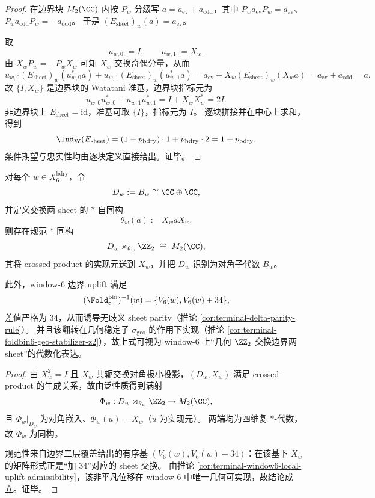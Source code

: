 \begin{proof}
在边界块 \(M_2(\CC)\) 内按 \(P_w\)-分级写
\(
a=a_{\mathrm{ev}}+a_{\mathrm{odd}}
\)，其中
\(
P_wa_{\mathrm{ev}}P_w=a_{\mathrm{ev}}
\)、\(
P_wa_{\mathrm{odd}}P_w=-a_{\mathrm{odd}}
\)。
于是 \((E_{\mathrm{sheet}})_w(a)=a_{\mathrm{ev}}\)。

取
\[
u_{w,0}:=I,\qquad u_{w,1}:=X_w.
\]
由 \(X_wP_w=-P_wX_w\) 可知 \(X_w\) 交换奇偶分量，从而
\[
u_{w,0}(E_{\mathrm{sheet}})_w(u_{w,0}^\ast a)+u_{w,1}(E_{\mathrm{sheet}})_w(u_{w,1}^\ast a)
=a_{\mathrm{ev}}+X_w(E_{\mathrm{sheet}})_w(X_wa)
=a_{\mathrm{ev}}+a_{\mathrm{odd}}
=a.
\]
故 \(\{I,X_w\}\) 是边界块的 Watatani 准基，边界块指标元为
\[
u_{w,0}u_{w,0}^\ast+u_{w,1}u_{w,1}^\ast=I+X_wX_w^\ast=2I.
\]
非边界块上 \(E_{\mathrm{sheet}}=\mathrm{id}\)，准基可取 \(\{I\}\)，指标元为 \(I\)。
逐块拼接并在中心上求和，得到
\[
\Ind_{\mathrm W}(E_{\mathrm{sheet}})
=(1-p_{\mathrm{bdry}})\cdot 1+p_{\mathrm{bdry}}\cdot 2
=1+p_{\mathrm{bdry}}.
\]
条件期望与忠实性均由逐块定义直接给出。证毕。
\end{proof}

\begin{theorem}[边界块的 crossed product 刻画与 \texorpdfstring{\(\delta=34\)}{delta=34} 的几何实现]\label{thm:conclusion-window6-boundary-crossed-product-delta34}
对每个 \(w\in X_6^{\mathrm{bdry}}\)，令
\[
D_w:=B_w\cong \CC\oplus\CC,
\]
并定义交换两 sheet 的 \(\ast\)-自同构
\[
\theta_w(a):=X_waX_w.
\]
则存在规范 \(\ast\)-同构
\[
D_w\rtimes_{\theta_w}\ZZ_2\ \cong\ M_2(\CC),
\]
其将 crossed-product 的实现元送到 \(X_w\)，并把 \(D_w\) 识别为对角子代数 \(B_w\)。

此外，window-\(6\) 边界 uplift 满足
\[
(\Fold^{\mathrm{bin}}_6)^{-1}(w)=\{V_6(w),V_6(w)+34\},
\]
差值严格为 \(34\)，从而诱导无歧义 sheet parity（推论 \ref{cor:terminal-delta-parity-rule}）。
并且该翻转在几何稳定子 \(\sigma_{\mathrm{geo}}\) 的作用下实现（推论 \ref{cor:terminal-foldbin6-geo-stabilizer-z2}），故上式可视为 window-\(6\) 上“几何 \(\ZZ_2\) 交换边界两 sheet”的代数化表达。
\end{theorem}
\begin{proof}
由 \(X_w^2=I\) 且 \(X_w\) 共轭交换对角极小投影，\((D_w,X_w)\) 满足 crossed-product 的生成关系，故由泛性质得到满射
\[
\Phi_w:D_w\rtimes_{\theta_w}\ZZ_2\to M_2(\CC),
\]
且 \(\Phi_w|_{D_w}\) 为对角嵌入、\(\Phi_w(u)=X_w\)（\(u\) 为实现元）。
两端均为四维复 \(\ast\)-代数，故 \(\Phi_w\) 为同构。

规范性来自边界二层覆盖给出的有序基 \((V_6(w),V_6(w)+34)\)：在该基下 \(X_w\) 的矩阵形式正是“加 \(34\)”对应的 sheet 交换。
由推论 \ref{cor:terminal-window6-local-uplift-admissibility}，该非平凡位移在 window-\(6\) 中唯一几何可实现，故结论成立。证毕。
\end{proof}

